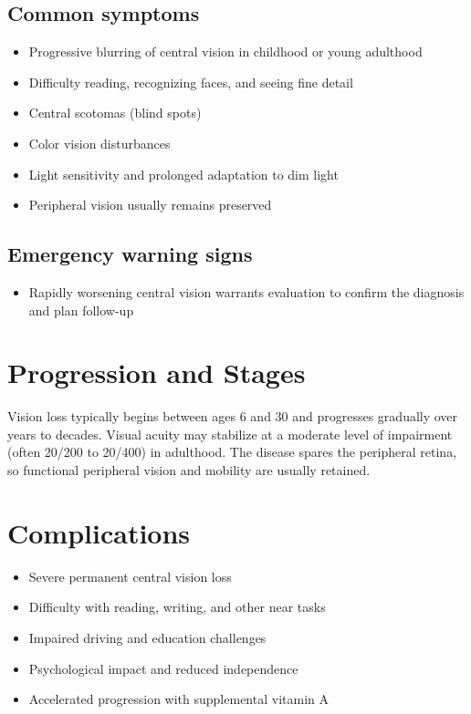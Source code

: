 \subsection{Common symptoms}
\begin{itemize}[noitemsep]
  \item Progressive blurring of central vision in childhood or young adulthood
  \item Difficulty reading, recognizing faces, and seeing fine detail
  \item Central scotomas (blind spots)
  \item Color vision disturbances
  \item Light sensitivity and prolonged adaptation to dim light
  \item Peripheral vision usually remains preserved
\end{itemize}
\subsection{Emergency warning signs}
\begin{itemize}[noitemsep]
  \item Rapidly worsening central vision warrants evaluation to confirm the diagnosis and plan follow-up
\end{itemize}
\section{Progression and Stages}
Vision loss typically begins between ages 6 and 30 and progresses gradually over years to decades. Visual acuity may stabilize at a moderate level of impairment (often 20/200 to 20/400) in adulthood. The disease spares the peripheral retina, so functional peripheral vision and mobility are usually retained.
\section{Complications}
\begin{itemize}[noitemsep]
  \item Severe permanent central vision loss
  \item Difficulty with reading, writing, and other near tasks
  \item Impaired driving and education challenges
  \item Psychological impact and reduced independence
  \item Accelerated progression with supplemental vitamin A
\end{itemize}
